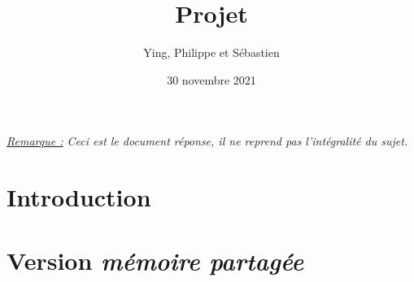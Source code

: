 \documentclass{sebaClass}
\title{Projet}
\author{Ying, Philippe et Sébastien}
\date{30 novembre 2021}
\begin{document}
\maketitle
\tableofcontents

\vspace*{\fill}
\textit{\underline{Remarque :} Ceci est le document réponse, il ne reprend pas l'intégralité du sujet.}
\newpage

\section{Introduction}


\section{Version \textit{mémoire partagée}}

\end{document}
